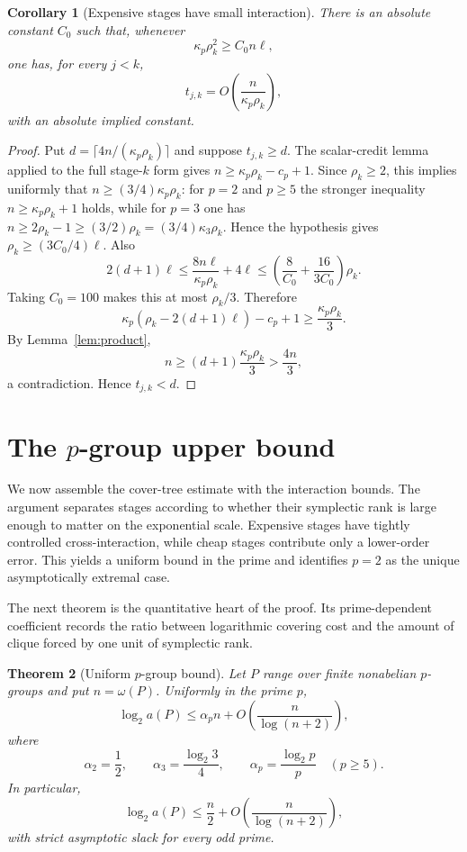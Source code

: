 \documentclass[11pt]{article}
\newtheorem{theorem}{Theorem}[section]
\newtheorem{corollary}[theorem]{Corollary}
\theoremstyle{definition}
\theoremstyle{remark}
\begin{document}
\begin{corollary}[Expensive stages have small interaction]\label{cor:small-interaction}
There is an absolute constant $C_0$ such that, whenever
\[
\kappa_p\rho_k^2\ge C_0n\ell,
\]
one has, for every $j<k$,
\[
t_{j,k}=O\!\left(\frac{n}{\kappa_p\rho_k}\right),
\]
with an absolute implied constant.
\end{corollary}

\begin{proof}
Put $d=\lceil4n/(\kappa_p\rho_k)\rceil$ and suppose $t_{j,k}\ge d$. The scalar-credit lemma applied to the full stage-$k$ form gives $n\ge\kappa_p\rho_k-c_p+1$. Since $\rho_k\ge2$, this implies uniformly that $n\ge(3/4)\kappa_p\rho_k$: for $p=2$ and $p\ge5$ the stronger inequality $n\ge\kappa_p\rho_k+1$ holds, while for $p=3$ one has $n\ge2\rho_k-1\ge(3/2)\rho_k=(3/4)\kappa_3\rho_k$. Hence the hypothesis gives $\rho_k\ge(3C_0/4)\ell$. Also
\[
2(d+1)\ell\le\frac{8n\ell}{\kappa_p\rho_k}+4\ell
\le\left(\frac8{C_0}+\frac{16}{3C_0}\right)\rho_k.
\]
Taking $C_0=100$ makes this at most $\rho_k/3$. Therefore
\[
\kappa_p(\rho_k-2(d+1)\ell)-c_p+1\ge\frac{\kappa_p\rho_k}{3}.
\]
By Lemma~\ref{lem:product},
\[
n\ge(d+1)\frac{\kappa_p\rho_k}{3}>\frac{4n}{3},
\]
a contradiction. Hence $t_{j,k}<d$.
\end{proof}

\section{The \texorpdfstring{$p$}{p}-group upper bound}

We now assemble the cover-tree estimate with the interaction bounds. The argument separates stages according to whether their symplectic rank is large enough to matter on the exponential scale. Expensive stages have tightly controlled cross-interaction, while cheap stages contribute only a lower-order error. This yields a uniform bound in the prime and identifies $p=2$ as the unique asymptotically extremal case.

The next theorem is the quantitative heart of the proof. Its prime-dependent coefficient records the ratio between logarithmic covering cost and the amount of clique forced by one unit of symplectic rank.

\begin{theorem}[Uniform $p$-group bound]\label{thm:pgroup}
Let $P$ range over finite nonabelian $p$-groups and put $n=\omega(P)$. Uniformly in the prime $p$,
\[
\log_2a(P)\le\alpha_p n+O\!\left(\frac{n}{\log(n+2)}\right),
\]
where
\[
\alpha_2=\frac12,\qquad \alpha_3=\frac{\log_2 3}{4},\qquad \alpha_p=\frac{\log_2 p}{p}\quad(p\ge5).
\]
In particular,
\[
\log_2a(P)\le\frac n2+O\!\left(\frac{n}{\log(n+2)}\right),
\]
with strict asymptotic slack for every odd prime.
\end{theorem}
\end{document}
